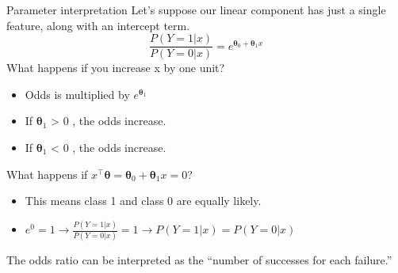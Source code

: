\documentclass[aspectratio=169]{../latex_main/tntbeamer}  %
\begin{document}
	
	\begin{frame}{Parameter interpretation}
	  Let’s suppose our linear component has just a single feature, along with an intercept term.
	   \begin{equation*}
	       \frac{P(Y=1|x)}{P(Y=0|x)} = e^{\bm{\theta}_0 + \bm{\theta}_1x}
	   \end{equation*}
	  What happens if you increase x by one unit?
	  \begin{itemize}
	      \item Odds is multiplied by $e^{\bm{\theta}_1}$
	      \item If      $\bm{\theta}_1$ > 0         , the odds increase.
	      \item If         $\bm{\theta}_1$ < 0      , the odds increase.
	  \end{itemize}
	  What happens if              $x^\intercal\bm{\theta} = \bm{\theta}_0 + \bm{\theta}_1x = 0$?
	  \begin{itemize}
	      \item This means class 1 and class 0 are equally likely.
	      \item $e^0 = 1 \rightarrow \frac{P(Y=1|x)}{P(Y=0|x)} = 1 \rightarrow P(Y=1|x) = P(Y=0|x)$
	  \end{itemize}
	  The odds ratio can be interpreted as the “number of successes for each failure.”
	\end{frame}
\end{document}
